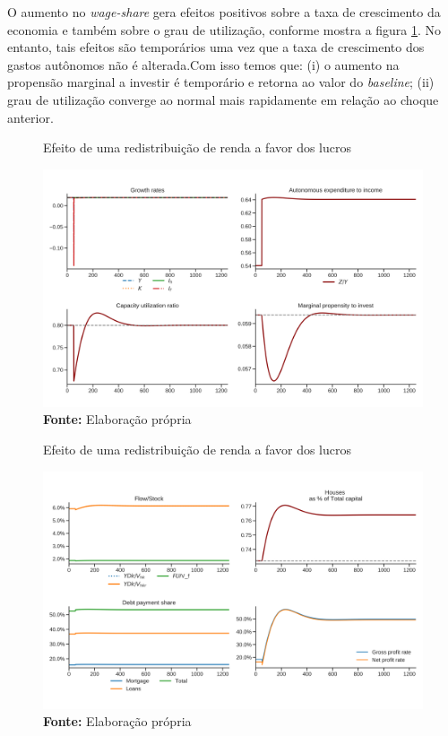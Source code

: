O aumento no \textit{wage-share} gera efeitos positivos sobre a taxa de crescimento da economia e também sobre o grau de utilização, conforme mostra a figura \ref{choque_2}. No entanto, tais efeitos são temporários uma vez que a taxa de crescimento dos gastos autônomos não é alterada.Com isso temos que: (i) o aumento na propensão marginal a investir é temporário e retorna ao valor do \textit{baseline}; (ii) grau de utilização converge ao normal mais rapidamente em relação ao choque anterior. 


\begin{figure}[H]
	\centering
	\caption{Efeito de uma redistribuição de renda a favor dos lucros}
	\label{choque_2}
	\includegraphics[width=\textwidth]{../../Modelo/Versoes/Shock_2.png}
	\caption*{\textbf{Fonte:} Elaboração própria}
\end{figure}


\begin{figure}[H]
	\centering
	\caption{Efeito de uma redistribuição de renda a favor dos lucros}
	\label{choque_2Norms}
	\includegraphics[width=\textwidth]{../../Modelo/Versoes/Shock_2Norms.png}
	\caption*{\textbf{Fonte:} Elaboração própria}
\end{figure}

